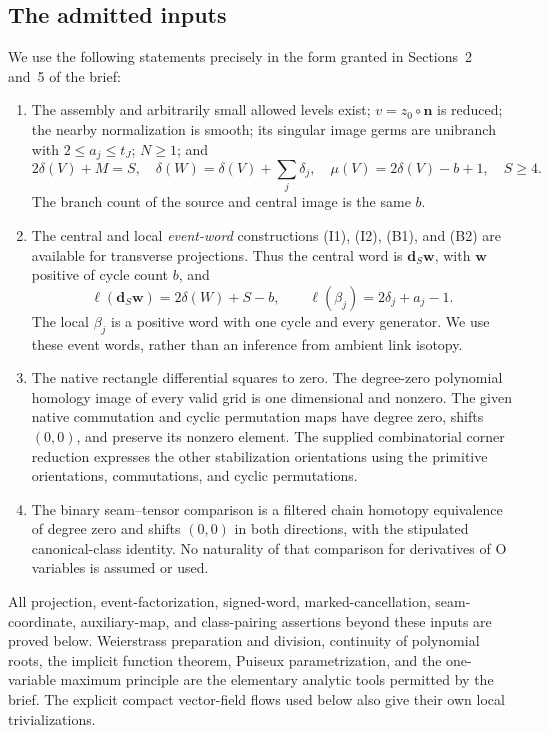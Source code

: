 \documentclass[11pt,a4paper]{article}
\theoremstyle{remark}
\begin{document}
\subsection{The admitted inputs}

We use the following statements precisely in the form granted in
Sections~2 and~5 of the brief:
\begin{enumerate}
\item The assembly and arbitrarily small allowed levels exist;
$v=z_0\circ\boldsymbol n$ is reduced; the nearby normalization is
smooth; its singular image germs are unibranch with
$2\le a_j\le t_J$; $N\ge1$; and
\[
 2\delta(V)+M=S,\quad
 \delta(W)=\delta(V)+\sum_j\delta_j,\quad
 \mu(V)=2\delta(V)-b+1,\quad S\ge4.
\]
The branch count of the source and central image is the same $b$.
\item The central and local \emph{event-word} constructions (I1),
(I2), (B1), and (B2) are available for transverse projections.
Thus the central word is $\mathbf d_S\mathbf w$, with
$\mathbf w$ positive of cycle count $b$, and
\[
 \ell(\mathbf d_S\mathbf w)=2\delta(W)+S-b,\qquad
 \ell(\beta_j)=2\delta_j+a_j-1.
\]
The local $\beta_j$ is a positive word with one cycle and every
generator.  We use these event words, rather than an inference from
ambient link isotopy.
\item The native rectangle differential squares to zero.  The
degree-zero polynomial homology image of every valid grid is one
dimensional and nonzero.  The given native commutation and cyclic
permutation maps have degree zero, shifts $(0,0)$, and preserve its
nonzero element.  The supplied combinatorial corner reduction
expresses the other stabilization orientations using the primitive
orientations, commutations, and cyclic permutations.
\item The binary seam--tensor comparison is a filtered chain homotopy
equivalence of degree zero and shifts $(0,0)$ in both directions,
with the stipulated canonical-class identity.  No naturality of
that comparison for derivatives of O variables is assumed or used.
\end{enumerate}
All projection, event-factorization, signed-word, marked-cancellation,
seam-coordinate, auxiliary-map, and class-pairing assertions beyond
these inputs are proved below.  Weierstrass preparation and division,
continuity of polynomial roots, the implicit function theorem,
Puiseux parametrization, and the one-variable maximum principle are
the elementary analytic tools permitted by the brief.  The explicit
compact vector-field flows used below also give their own local
trivializations.
\end{document}
